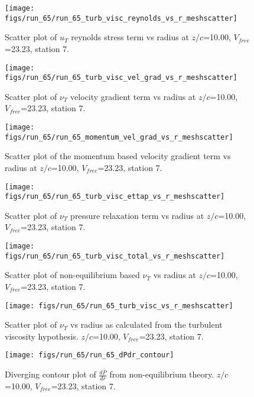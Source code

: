 \begin{figure}[H]
\centering
\texttt{[image: figs/run\_65/run\_65\_turb\_visc\_reynolds\_vs\_r\_meshscatter]}
\caption{Scatter plot of $
u_T$ reynolds stress term vs radius at $z/c$=10.00, $V_{free}$=23.23, station 7.}
\end{figure}


\begin{figure}[H]
\centering
\texttt{[image: figs/run\_65/run\_65\_turb\_visc\_vel\_grad\_vs\_r\_meshscatter]}
\caption{Scatter plot of $\nu_T$ velocity gradient term vs radius at $z/c$=10.00, $V_{free}$=23.23, station 7.}
\end{figure}


\begin{figure}[H]
\centering
\texttt{[image: figs/run\_65/run\_65\_momentum\_vel\_grad\_vs\_r\_meshscatter]}
\caption{Scatter plot of the momentum based velocity gradient term vs radius at $z/c$=10.00, $V_{free}$=23.23, station 7.}
\end{figure}


\begin{figure}[H]
\centering
\texttt{[image: figs/run\_65/run\_65\_turb\_visc\_ettap\_vs\_r\_meshscatter]}
\caption{Scatter plot of $\nu_T$ pressure relaxation term vs radius at $z/c$=10.00, $V_{free}$=23.23, station 7.}
\end{figure}


\begin{figure}[H]
\centering
\texttt{[image: figs/run\_65/run\_65\_turb\_visc\_total\_vs\_r\_meshscatter]}
\caption{Scatter plot of non-equilibrium based $\nu_T$ vs radius at $z/c$=10.00, $V_{free}$=23.23, station 7.}
\end{figure}


\begin{figure}[H]
\centering
\texttt{[image: figs/run\_65/run\_65\_turb\_visc\_vs\_r\_meshscatter]}
\caption{Scatter plot of $\nu_T$ vs radius as calculated from the turbulent viscosity hypothesis. $z/c$=10.00, $V_{free}$=23.23, station 7.}
\end{figure}


\begin{figure}[H]
\centering
\texttt{[image: figs/run\_65/run\_65\_dPdr\_contour]}
\caption{Diverging contour plot of $\frac{d\bar{P}}{dr}$ from non-equilibrium theory. $z/c$=10.00, $V_{free}$=23.23, station 7.}
\end{figure}



